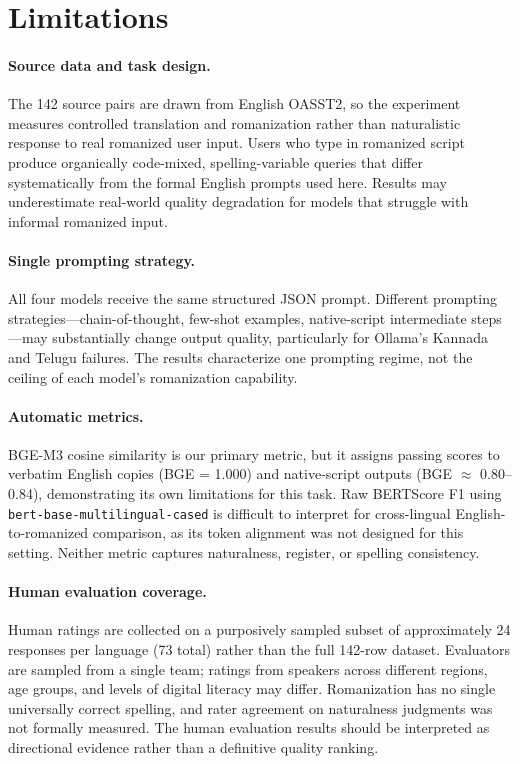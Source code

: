 \section{Limitations}

\paragraph{Source data and task design.}
The 142 source pairs are drawn from English OASST2, so the experiment measures
controlled translation and romanization rather than naturalistic response to
real romanized user input. Users who type in romanized script produce
organically code-mixed, spelling-variable queries that differ systematically
from the formal English prompts used here. Results may underestimate real-world
quality degradation for models that struggle with informal romanized input.

\paragraph{Single prompting strategy.}
All four models receive the same structured JSON prompt. Different prompting
strategies---chain-of-thought, few-shot examples, native-script intermediate
steps---may substantially change output quality, particularly for Ollama's
Kannada and Telugu failures. The results characterize one prompting regime,
not the ceiling of each model's romanization capability.

\paragraph{Automatic metrics.}
BGE-M3 cosine similarity is our primary metric, but it assigns passing scores
to verbatim English copies (BGE = 1.000) and native-script outputs
(BGE $\approx$ 0.80--0.84), demonstrating its own limitations for this task.
Raw BERTScore F1 using \texttt{bert-base-multilingual-cased} is difficult to
interpret for cross-lingual English-to-romanized comparison, as its token
alignment was not designed for this setting. Neither metric captures
naturalness, register, or spelling consistency.

\paragraph{Human evaluation coverage.}
Human ratings are collected on a purposively sampled subset of approximately 24 responses
per language (73 total) rather than the full 142-row dataset. Evaluators are sampled from
a single team; ratings from speakers across different regions, age groups, and
levels of digital literacy may differ. Romanization has no single universally
correct spelling, and rater agreement on naturalness judgments was not
formally measured. The human evaluation results should be interpreted as
directional evidence rather than a definitive quality ranking.

